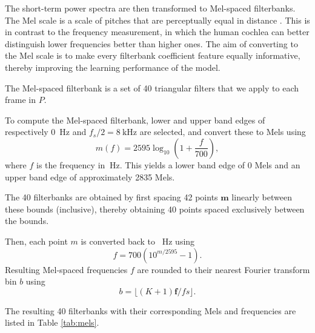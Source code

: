 			The short-term power spectra are then transformed to Mel-spaced filterbanks.
			The Mel scale is a scale of pitches that are perceptually equal in distance \citep{stevens1937scale}.
			This is in contrast to the frequency measurement, in which the human cochlea can better distinguish lower frequencies better than higher ones.
			The aim of converting to the Mel scale is to make every filterbank coefficient feature equally informative, thereby improving the learning performance of the model.

			The Mel-spaced filterbank is a set of 40 triangular filters that we apply to each frame in $P$.

			To compute the Mel-spaced filterbank, lower and upper band edges of respectively \SI{0}{\Hz} and $f_s/2 = \SI{8}{\kHz}$ are selected, and convert these to Mels using
			\begin{equation}
				m(f) = 2595\log_{10}\left(1 + \frac{f}{700}\right),
			\end{equation}
			where $f$ is the frequency in $\SI{}{\Hz}$.
			This yields a lower band edge of 0 Mels and an upper band edge of approximately 2835 Mels.

			The 40 filterbanks are obtained by first spacing 42 points $\mathbf{m}$ linearly between these bounds (inclusive), thereby obtaining 40 points spaced exclusively between the bounds.

			Then, each point $m$ is converted back to \SI{}{\Hz} using
			\begin{equation}
				f = 700\left(10^{m/2595}-1\right).
			\end{equation}
			Resulting Mel-spaced frequencies $f$ are rounded to their nearest Fourier transform bin $b$ using
			\begin{equation}
				b = \lfloor(K+1)\mathbf{f}/fs\rfloor.
			\end{equation}

			The resulting 40 filterbanks with their corresponding Mels and frequencies are listed in Table \ref{tab:mels}.

